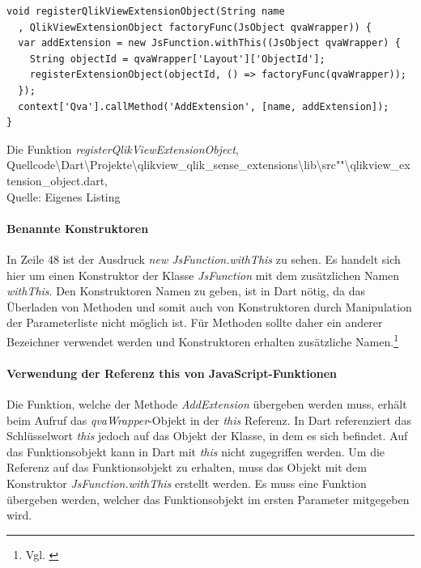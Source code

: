 \begin{listing}[htbp]
\begin{verbatim}
void registerQlikViewExtensionObject(String name
  , QlikViewExtensionObject factoryFunc(JsObject qvaWrapper)) {
  var addExtension = new JsFunction.withThis((JsObject qvaWrapper) {
    String objectId = qvaWrapper['Layout']['ObjectId'];
    registerExtensionObject(objectId, () => factoryFunc(qvaWrapper));
  });
  context['Qva'].callMethod('AddExtension', [name, addExtension]);
}
\end{verbatim}
\caption[Die Funktion \textit{registerQlikViewExtensionObject}]{Die Funktion \textit{registerQlikViewExtensionObject}, \\Quellcode\textbackslash{}Dart\textbackslash{}Projekte\textbackslash{}qlikview\_qlik\_sense\_extensions\textbackslash{}lib\textbackslash{}src""\textbackslash{}qlikview\_extension\_object.dart, \\Quelle: Eigenes Listing}
\label{lst:registerQlikViewExtensionObject}
\end{listing}

\newpage
\paragraph{Benannte Konstruktoren} 
In Zeile 48 ist der Ausdruck \textit{new JsFunction.withThis} zu sehen. Es handelt sich hier um einen Konstruktor der Klasse \textit{JsFunction} mit dem zusätzlichen Namen \textit{withThis}. Den Konstruktoren Namen zu geben, ist in Dart nötig, da das Überladen von Methoden und somit auch von Konstruktoren durch Manipulation der Parameterliste nicht möglich ist. Für Methoden sollte daher ein anderer Bezeichner verwendet werden und Konstruktoren erhalten zusätzliche Namen.\footnote{Vgl. \cite[S. 133]{kopec2014dart}}

\paragraph{Verwendung der Referenz this von JavaScript-Funktionen}
Die Funktion, welche der Methode \textit{AddExtension} übergeben werden muss, erhält beim Aufruf das \textit{qvaWrapper}-Objekt in der \textit{this} Referenz. In Dart referenziert das Schlüssel\-wort \textit{this} jedoch auf das Objekt der Klasse, in dem es sich befindet. Auf das Funktionsobjekt kann in Dart mit \textit{this} nicht zugegriffen werden. Um die Referenz auf das Funktionsobjekt zu erhalten, muss das Objekt mit dem Konstruktor \textit{JsFunction.withThis} erstellt werden. Es muss eine Funktion übergeben werden, welcher das Funktionsobjekt im ersten Parameter mitgegeben wird.

